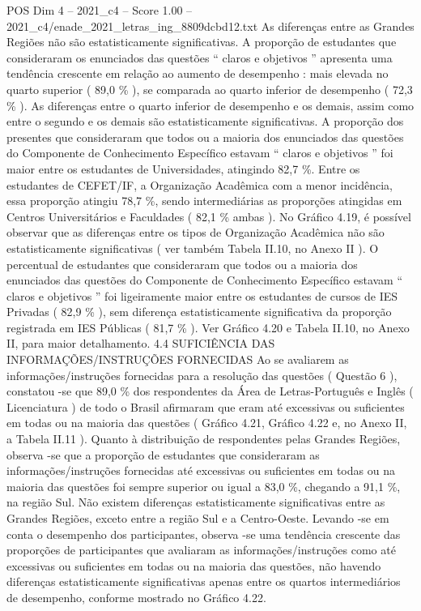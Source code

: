 \begin{textsample}{POS Dim 4 – 2021\_c4 – Score 1.00 – 2021\_c4/enade\_2021\_letras\_ing\_8809dcbd12.txt}
As diferenças entre as Grandes Regiões não são estatisticamente significativas.
A proporção de estudantes que consideraram os enunciados das questões “ claros e objetivos ” apresenta uma tendência crescente em relação ao aumento de desempenho : mais elevada no quarto superior ( 89,0 \% ), se comparada ao quarto inferior de desempenho ( 72,3 \% ).
As diferenças entre o quarto inferior de desempenho e os demais, assim como entre o segundo e os demais são estatisticamente significativas.
A proporção dos presentes que consideraram que todos ou a maioria dos enunciados das questões do Componente de Conhecimento Específico estavam “ claros e objetivos ” foi maior entre os estudantes de Universidades, atingindo 82,7 \%.
Entre os estudantes de CEFET/IF, a Organização Acadêmica com a menor incidência, essa proporção atingiu 78,7 \%, sendo intermediárias as proporções atingidas em Centros Universitários e Faculdades ( 82,1 \% ambas ).
No Gráfico 4.19, é possível observar que as diferenças entre os tipos de Organização Acadêmica não são estatisticamente significativas ( ver também Tabela II.10, no Anexo II ).
O percentual de estudantes que consideraram que todos ou a maioria dos enunciados das questões do Componente de Conhecimento Específico estavam “ claros e objetivos ” foi ligeiramente maior entre os estudantes de cursos de IES Privadas ( 82,9 \% ), sem diferença estatisticamente significativa da proporção registrada em IES Públicas ( 81,7 \% ).
Ver Gráfico 4.20 e Tabela II.10, no Anexo II, para maior detalhamento. 4.4 SUFICIÊNCIA DAS INFORMAÇÕES/INSTRUÇÕES FORNECIDAS Ao se avaliarem as informações/instruções fornecidas para a resolução das questões ( Questão 6 ), constatou -se que 89,0 \% dos respondentes da Área de Letras-Português e Inglês ( Licenciatura ) de todo o Brasil afirmaram que eram até excessivas ou suficientes em todas ou na maioria das questões ( Gráfico 4.21, Gráfico 4.22 e, no Anexo II, a Tabela II.11 ).
Quanto à distribuição de respondentes pelas Grandes Regiões, observa -se que a proporção de estudantes que consideraram as informações/instruções fornecidas até excessivas ou suficientes em todas ou na maioria das questões foi sempre superior ou igual a 83,0 \%, chegando a 91,1 \%, na região Sul.
Não existem diferenças estatisticamente significativas entre as Grandes Regiões, exceto entre a região Sul e a Centro-Oeste.
Levando -se em conta o desempenho dos participantes, observa -se uma tendência crescente das proporções de participantes que avaliaram as informações/instruções como até excessivas ou suficientes em todas ou na maioria das questões, não havendo diferenças estatisticamente significativas apenas entre os quartos intermediários de desempenho, conforme mostrado no Gráfico 4.22.

\end{textsample}
